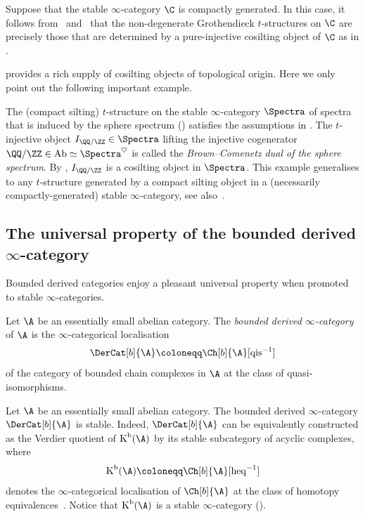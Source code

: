 \documentclass[a4paper]{amsart}
\begin{document}
\begin{remark}
  Suppose that the stable $\infty$-category $\C$ is compactly generated. In this
  case, it follows from~\cite[Corollary 3.8]{AHMV17}
  and~\cite[Theorem~4.6]{Lak20} that the non-degenerate Grothendieck
  $t$-structures on $\C$ are precisely those that are determined by a
  pure-injective cosilting object of $\C$ as in .
\end{remark}

 provides a rich supply of cosilting objects of
topological origin. Here we only point out the following important example.

\begin{example}
  The (compact silting) $t$-structure on the stable $\infty$-category $\Spectra$
  of spectra that is induced by the sphere spectrum ()
  satisfies the assumptions in . The $t$-injective object
  $I_{\QQ/\ZZ}\in\Spectra$ lifting the injective cogenerator
  $\QQ/\ZZ\in\operatorname{Ab}\simeq\Spectra^\heartsuit$ is called the
  \emph{Brown--Comenetz dual of the sphere spectrum}. By ,
  $I_{\QQ/\ZZ}$ is a cosilting object in $\Spectra$. This example generalises to
  any $t$-structure generated by a compact silting object in a (necessarily
  compactly-generated) stable $\infty$-category, see also~\cite[Examples~6.8]{SS23}.
\end{example}

\subsection{The universal property of the bounded derived $\infty$-category}

Bounded derived categories enjoy a
pleasant universal property when promoted to stable $\infty$-categories.

\begin{definition}
  Let $\A$ be an essentially small abelian category. The \emph{bounded derived
    $\infty$-category} of $\A$ is the $\infty$-categorical localisation
  \[
    \DerCat[b]{\A}\coloneqq\Ch[b]{\A}[\mathrm{qis}^{-1}]
  \]
  of the category of bounded chain complexes in $\A$ at the class of quasi-isomorphisms.
\end{definition}

\begin{remark}
  Let $\A$ be an essentially small abelian category. The bounded derived
  $\infty$-category $\DerCat[b]{\A}$ is stable. Indeed, $\DerCat[b]{\A}$ can be
  equivalently constructed as the Verdier quotient of
  $\operatorname{K}^{\mathrm{b}}(\A)$ by its stable subcategory of acyclic
  complexes, where
  \[
    \operatorname{K}^{\mathrm{b}}(\A)\coloneqq\Ch[b]{\A}[\mathrm{heq}^{-1}]
  \]
  denotes the $\infty$-categorical localisation of $\Ch[b]{\A}$ at the class of
  homotopy equivalences~\cite[Section~7.4]{BCKW25}. Notice that
  $\operatorname{K}^{\mathrm{b}}(\A)$ is a stable $\infty$-category
  ().
\end{remark}
\end{document}
